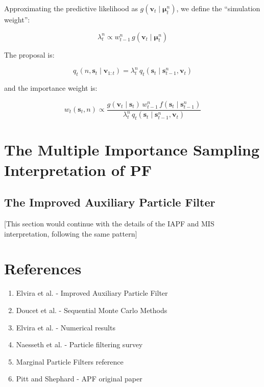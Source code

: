 \documentclass[11pt,a4paper]{article}
\begin{document}
Approximating the predictive likelihood as $g(\mathbf{v}_t \mid \boldsymbol{\mu}_t^n)$, we define the ``simulation weight'':

\begin{equation}
\lambda_t^n \propto w_{t-1}^n \, g(\mathbf{v}_t \mid \boldsymbol{\mu}_t^n)
\end{equation}

The proposal is:

\begin{equation}
q_t(n, \mathbf{s}_t \mid \mathbf{v}_{1:t}) = \lambda_t^n \, q_t(\mathbf{s}_t \mid \mathbf{s}_{t-1}^n, \mathbf{v}_t)
\end{equation}

and the importance weight is:

\begin{equation}
w_t(\mathbf{s}_t, n) \propto \frac{g(\mathbf{v}_t \mid \mathbf{s}_t) \, w_{t-1}^n \, f(\mathbf{s}_t \mid \mathbf{s}_{t-1}^n)}{\lambda_t^n \, q_t(\mathbf{s}_t \mid \mathbf{s}_{t-1}^n, \mathbf{v}_t)}
\end{equation}

\section{The Multiple Importance Sampling Interpretation of PF}

\subsection{The Improved Auxiliary Particle Filter}

[This section would continue with the details of the IAPF and MIS interpretation, following the same pattern]

\section*{References}

\begin{enumerate}
\item Elvira et al. - Improved Auxiliary Particle Filter
\item Doucet et al. - Sequential Monte Carlo Methods
\item Elvira et al. - Numerical results
\item Naesseth et al. - Particle filtering survey
\item Marginal Particle Filters reference
\item Pitt and Shephard - APF original paper
\end{enumerate}
\end{document}
